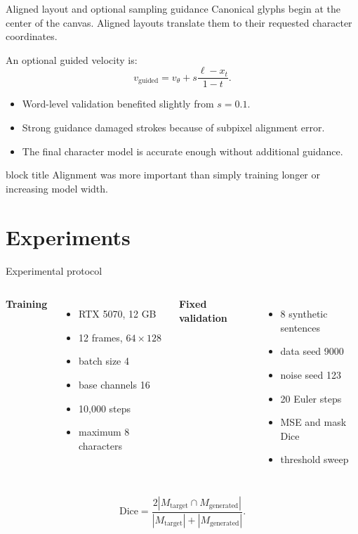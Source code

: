 \documentclass[aspectratio=169,xcolor=svgnames]{beamer}
\newcommand{\keypoint}[1]{%
\begin{center}
\begin{beamercolorbox}[rounded=true,shadow=true,wd=0.88\textwidth,sep=0.6em,center]{block title}
#1
\end{beamercolorbox}
\end{center}
}
\begin{document}
\begin{frame}{Aligned layout and optional sampling guidance}
Canonical glyphs begin at the center of the canvas. Aligned layouts translate them to their requested character coordinates.

An optional guided velocity is:
\[
v_{\mathrm{guided}}
=v_\theta
+s\frac{\ell-x_t}{1-t}.
\]

\begin{itemize}
    \item Word-level validation benefited slightly from $s=0.1$.
    \item Strong guidance damaged strokes because of subpixel alignment error.
    \item The final character model is accurate enough without additional guidance.
\end{itemize}

\keypoint{Alignment was more important than simply training longer or increasing model width.}
\end{frame}

\section{Experiments}

\begin{frame}{Experimental protocol}
\begin{columns}[T]
\textbf{Training}
\begin{itemize}
    \item RTX 5070, 12 GB
    \item 12 frames, $64\times128$
    \item batch size 4
    \item base channels 16
    \item 10,000 steps
    \item maximum 8 characters
\end{itemize}

\textbf{Fixed validation}
\begin{itemize}
    \item 8 synthetic sentences
    \item data seed 9000
    \item noise seed 123
    \item 20 Euler steps
    \item MSE and mask Dice
    \item threshold sweep
\end{itemize}
\end{columns}

\[
\mathrm{Dice}=\frac{2|M_{\mathrm{target}}\cap M_{\mathrm{generated}}|}
{|M_{\mathrm{target}}|+|M_{\mathrm{generated}}|}.
\]
\end{frame}
\end{document}
